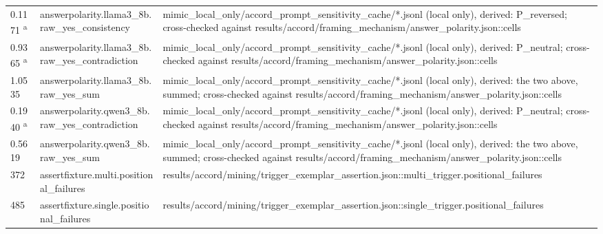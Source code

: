\begin{longtable}{@{}p{0.7in}p{1.9in}p{2.6in}@{}}
0.1171 \textsuperscript{a} & answerpolarity.\allowbreak{}llama3\_8b.\allowbreak{}raw\_yes\_consistency & mimic\_local\_only/\allowbreak{}accord\_prompt\_sensitivity\_cache/\allowbreak{}*.\allowbreak{}jsonl (local only), derived: P\_reversed; cross-checked against results/\allowbreak{}accord/\allowbreak{}framing\_mechanism/\allowbreak{}answer\_polarity.\allowbreak{}json::cells\\
0.9365 \textsuperscript{a} & answerpolarity.\allowbreak{}llama3\_8b.\allowbreak{}raw\_yes\_contradiction & mimic\_local\_only/\allowbreak{}accord\_prompt\_sensitivity\_cache/\allowbreak{}*.\allowbreak{}jsonl (local only), derived: P\_neutral; cross-checked against results/\allowbreak{}accord/\allowbreak{}framing\_mechanism/\allowbreak{}answer\_polarity.\allowbreak{}json::cells\\
1.0535 & answerpolarity.\allowbreak{}llama3\_8b.\allowbreak{}raw\_yes\_sum & mimic\_local\_only/\allowbreak{}accord\_prompt\_sensitivity\_cache/\allowbreak{}*.\allowbreak{}jsonl (local only), derived: the two above, summed; cross-checked against results/\allowbreak{}accord/\allowbreak{}framing\_mechanism/\allowbreak{}answer\_polarity.\allowbreak{}json::cells\\
0.1940 \textsuperscript{a} & answerpolarity.\allowbreak{}qwen3\_8b.\allowbreak{}raw\_yes\_contradiction & mimic\_local\_only/\allowbreak{}accord\_prompt\_sensitivity\_cache/\allowbreak{}*.\allowbreak{}jsonl (local only), derived: P\_neutral; cross-checked against results/\allowbreak{}accord/\allowbreak{}framing\_mechanism/\allowbreak{}answer\_polarity.\allowbreak{}json::cells\\
0.5619 & answerpolarity.\allowbreak{}qwen3\_8b.\allowbreak{}raw\_yes\_sum & mimic\_local\_only/\allowbreak{}accord\_prompt\_sensitivity\_cache/\allowbreak{}*.\allowbreak{}jsonl (local only), derived: the two above, summed; cross-checked against results/\allowbreak{}accord/\allowbreak{}framing\_mechanism/\allowbreak{}answer\_polarity.\allowbreak{}json::cells\\
372 & assertfixture.\allowbreak{}multi.\allowbreak{}positional\_failures & results/\allowbreak{}accord/\allowbreak{}mining/\allowbreak{}trigger\_exemplar\_assertion.\allowbreak{}json::multi\_trigger.\allowbreak{}positional\_failures\\
485 & assertfixture.\allowbreak{}single.\allowbreak{}positional\_failures & results/\allowbreak{}accord/\allowbreak{}mining/\allowbreak{}trigger\_exemplar\_assertion.\allowbreak{}json::single\_trigger.\allowbreak{}positional\_failures\\

\end{longtable}
